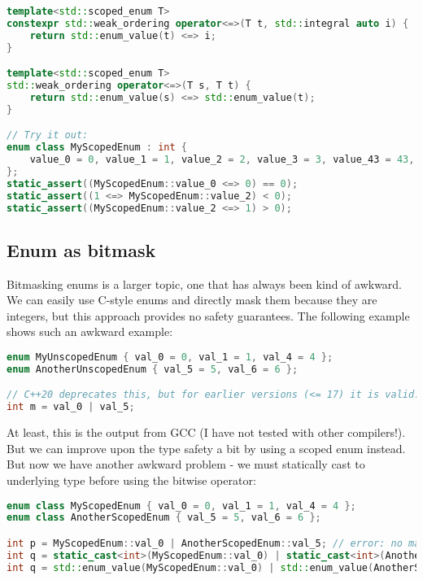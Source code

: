 \documentclass[
  format=manuscript,
  screen=true,
  review=false,
  nonacm=true,
  timestamp=true,
  balance=false]{acmart}
\newcommand{\beforecodespace}{\vspace{4mm}}
\begin{document}
\begin{lstlisting}[language=Cpp]
template<std::scoped_enum T>
constexpr std::weak_ordering operator<=>(T t, std::integral auto i) {
    return std::enum_value(t) <=> i;
}

template<std::scoped_enum T>
std::weak_ordering operator<=>(T s, T t) {
    return std::enum_value(s) <=> std::enum_value(t);
}

// Try it out:
enum class MyScopedEnum : int {
    value_0 = 0, value_1 = 1, value_2 = 2, value_3 = 3, value_43 = 43, value_57 = 57
};
static_assert((MyScopedEnum::value_0 <=> 0) == 0);
static_assert((1 <=> MyScopedEnum::value_2) < 0);
static_assert((MyScopedEnum::value_2 <=> 1) > 0);
\end{lstlisting}


\subsection{Enum as bitmask}

Bitmasking enums is a larger topic, one that has always been kind of awkward.
We can easily use C-style enums and directly mask them because they are integers,
but this approach provides no safety guarantees. The following example shows such
an awkward example:

\beforecodespace\begin{lstlisting}[language=Cpp]
enum MyUnscopedEnum { val_0 = 0, val_1 = 1, val_4 = 4 };
enum AnotherUnscopedEnum { val_5 = 5, val_6 = 6 };

// C++20 deprecates this, but for earlier versions (<= 17) it is valid.
int m = val_0 | val_5;
\end{lstlisting}

\noindent
At least, this is the output from GCC (I have not tested with other compilers!).
But we can improve upon the type safety a bit by using a scoped enum instead.
But now we have another awkward problem - we must statically cast to underlying
type before using the bitwise operator:

\beforecodespace\begin{lstlisting}[language=Cpp]
enum class MyScopedEnum { val_0 = 0, val_1 = 1, val_4 = 4 };
enum class AnotherScopedEnum { val_5 = 5, val_6 = 6 };

int p = MyScopedEnum::val_0 | AnotherScopedEnum::val_5; // error: no match for 'operator|'
int q = static_cast<int>(MyScopedEnum::val_0) | static_cast<int>(AnotherScopedEnum::val_5); // valid
int q = std::enum_value(MyScopedEnum::val_0) | std::enum_value(AnotherScopedEnum::val_5); // same
\end{lstlisting}
\end{document}
